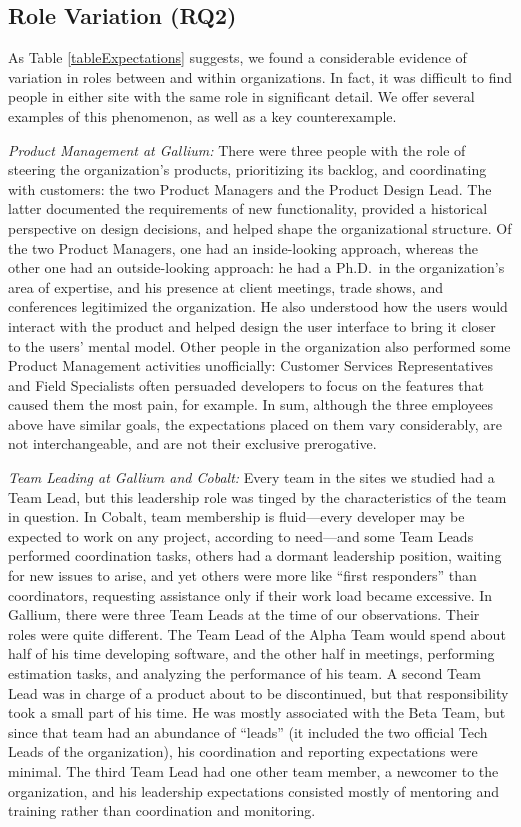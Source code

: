 \documentclass[10pt, conference, compsocconf]{IEEEtran}
\begin{document}


\subsection{Role Variation (RQ2)}

As Table \ref{tableExpectations} suggests, we found a considerable evidence of variation in roles between and within organizations. In fact, it was difficult to find people in either site with the same role in significant detail. We offer several examples of this phenomenon, as well as a key counterexample.

\emph{Product Management at Gallium:} There were three people with the role of steering the organization's products, prioritizing its backlog, and coordinating with customers: the two Product Managers and the Product Design Lead. The latter documented the requirements of new functionality, provided a historical perspective on design decisions, and helped shape the organizational structure. Of the two Product Managers, one had an inside-looking approach, whereas the other one had an outside-looking approach: he had a Ph.D.\ in the organization's area of expertise, and his presence at client meetings, trade shows, and conferences legitimized the organization. He also understood how the users would interact with the product and helped design the user interface to bring it closer to the users' mental model. Other people in the organization also performed some Product Management activities unofficially: Customer Services Representatives and Field Specialists often persuaded developers to focus on the features that caused them the most pain, for example. In sum, although the three employees above have similar goals, the expectations placed on them vary considerably, are not interchangeable, and are not their exclusive prerogative.

\emph{Team Leading at Gallium and Cobalt:} Every team in the sites we studied had a Team Lead, but this leadership role was tinged by the characteristics of the team in question. In Cobalt, team membership is fluid---every developer may be expected to work on any project, according to need---and some Team Leads performed coordination tasks, others had a dormant leadership position, waiting for new issues to arise, and yet others were more like ``first responders'' than coordinators, requesting assistance only if their work load became excessive. In Gallium, there were three Team Leads at the time of our observations. Their roles were quite different. The Team Lead of the Alpha Team would spend about half of his time developing software, and the other half in meetings, performing estimation tasks, and analyzing the performance of his team. A second Team Lead was in charge of a product about to be discontinued, but that responsibility took a small part of his time. He was mostly associated with the Beta Team, but since that team had an abundance of ``leads'' (it included the two official Tech Leads of the organization), his coordination and reporting expectations were minimal. The third Team Lead had one other team member, a newcomer to the organization, and his leadership expectations consisted mostly of mentoring and training rather than coordination and monitoring.
\end{document}
